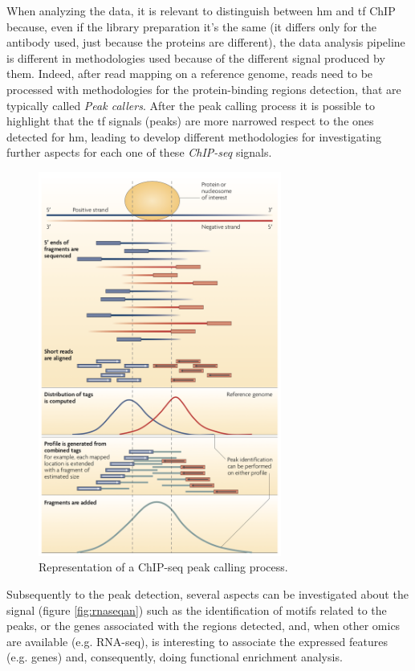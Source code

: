 When analyzing the data, it is relevant to distinguish between \gls{hm} and \gls{tf} ChIP because, even if the library preparation it's the same (it differs only for the antibody used, just because the proteins are different), the data analysis pipeline is different in methodologies used because of the different signal produced by them.
Indeed, after read mapping on a reference genome, reads need to be processed with methodologies for the protein-binding regions detection, that are typically called \textit{Peak callers}.
After the peak calling process it is possible to highlight that the \gls{tf} signals (peaks) are more narrowed respect to the ones detected for \gls{hm}, leading to develop different methodologies for investigating further aspects for each one of these \textit{ChIP-seq} signals.

\begin{figure}[H]
\centering
\includegraphics[width=8cm, keepaspectratio]{img/intro/peak_call.png}
\caption[ChIP-seq peak detection]{Representation of a  ChIP-seq peak calling process. \cite{Park2009}}
\label{fig:chipseqexp}
\end{figure}

Subsequently to the peak detection, several aspects can be investigated about the signal (figure \ref{fig:rnaseqan}) such as the identification of motifs related to the peaks, or the genes associated with the regions detected, and, when other omics are available (e.g. RNA-seq), is interesting to associate the expressed features (e.g. genes) and, consequently,  doing functional enrichment analysis. 





